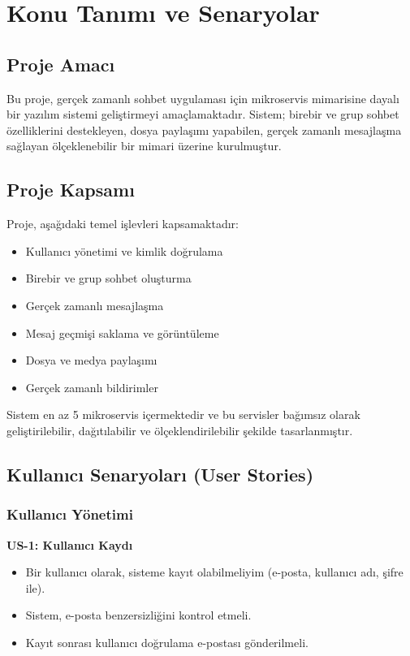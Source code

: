 \chapter{Konu Tanımı ve Senaryolar}

\section{Proje Amacı}
Bu proje, gerçek zamanlı sohbet uygulaması için mikroservis mimarisine dayalı bir yazılım sistemi geliştirmeyi amaçlamaktadır. Sistem; birebir ve grup sohbet özelliklerini destekleyen, dosya paylaşımı yapabilen, gerçek zamanlı mesajlaşma sağlayan ölçeklenebilir bir mimari üzerine kurulmuştur.

\section{Proje Kapsamı}
Proje, aşağıdaki temel işlevleri kapsamaktadır:
\begin{itemize}
    \item Kullanıcı yönetimi ve kimlik doğrulama
    \item Birebir ve grup sohbet oluşturma
    \item Gerçek zamanlı mesajlaşma
    \item Mesaj geçmişi saklama ve görüntüleme
    \item Dosya ve medya paylaşımı
    \item Gerçek zamanlı bildirimler
\end{itemize}

Sistem en az 5 mikroservis içermektedir ve bu servisler bağımsız olarak geliştirilebilir, dağıtılabilir ve ölçeklendirilebilir şekilde tasarlanmıştır.

\section{Kullanıcı Senaryoları (User Stories)}

\subsection{Kullanıcı Yönetimi}
\textbf{US-1: Kullanıcı Kaydı}
\begin{itemize}
    \item Bir kullanıcı olarak, sisteme kayıt olabilmeliyim (e-posta, kullanıcı adı, şifre ile).
    \item Sistem, e-posta benzersizliğini kontrol etmeli.
    \item Kayıt sonrası kullanıcı doğrulama e-postası gönderilmeli.
\end{itemize}

